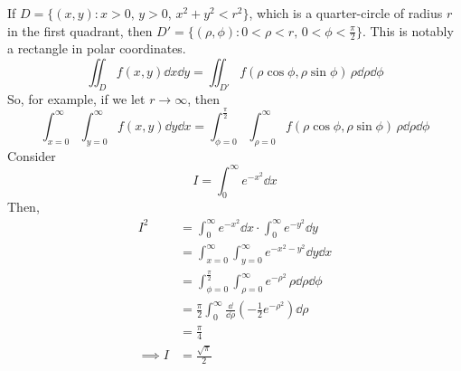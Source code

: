 If \(D = \{ (x, y) \colon x > 0,\, y > 0,\, x^2 + y^2 < r^2 \}\), which is a quarter-circle of radius \(r\) in the first quadrant, then \(D' = \{ (\rho, \phi) \colon 0 < \rho < r,\, 0 < \phi < \frac{\pi}{2} \}\).
This is notably a rectangle in polar coordinates.
\[
	\iint_D f(x, y)\dd{x} \dd{y} = \iint_{D'} f(\rho \cos \phi, \rho \sin \phi) \,\rho \dd{\rho} \dd{\phi}
\]
So, for example, if we let \(r \to \infty\), then
\[
	\int_{x=0}^\infty \int_{y=0}^\infty f(x, y) \dd{y}\dd{x} = \int_{\phi = 0}^{\frac{\pi}{2}} \int_{\rho = 0}^\infty f(\rho \cos \phi, \rho \sin \phi) \,\rho\dd{\rho}\dd{\phi}
\]
Consider
\[
	I = \int_0^\infty e^{-x^2} \dd{x}
\]
Then,
\begin{align*}
	I^2        & = \int_0^\infty e^{-x^2} \dd{x} \cdot \int_0^\infty e^{-y^2} \dd{y}                                  \\
	           & = \int_{x=0}^\infty \int_{y=0}^\infty e^{-x^2-y^2} \dd{y}\dd{x}                                      \\
	           & = \int_{\phi = 0}^{\frac{\pi}{2}} \int_{\rho = 0}^\infty e^{-\rho^2} \,\rho\dd{\rho}\dd{\phi}        \\
	           & = \frac{\pi}{2} \int_0^\infty \frac{\dd}{\dd{\rho}} \left( -\frac{1}{2}e^{-\rho^2} \right) \dd{\rho} \\
	           & = \frac{\pi}{4}                                                                                      \\
	\implies I & = \frac{\sqrt{\pi}}{2}
\end{align*}

